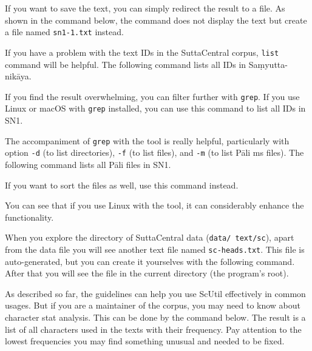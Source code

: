 If you want to save the text, you can simply redirect the result to a file. As shown in the command below, the command does not display the text but create a file named \texttt{sn1-1.txt} instead.


If you have a problem with the text IDs in the SuttaCentral corpus, \texttt{list} command will be helpful. The following command lists all IDs in Saṃyutta-nikāya.


If you find the result overwhelming, you can filter further with \texttt{grep}. If you use Linux or macOS with \texttt{grep} installed, you can use this command to list all IDs in SN1.


The accompaniment of \texttt{grep} with the tool is really helpful, particularly with option \texttt{-d} (to list directories), \texttt{-f} (to list files), and \texttt{-m} (to list Pāli ms files). The following command lists all Pāli files in SN1.


If you want to sort the files as well, use this command instead.


You can see that if you use Linux with the tool, it can considerably enhance the functionality.

When you explore the directory of SuttaCentral data (\texttt{data/ text/sc}), apart from the data file you will see another text file named \texttt{sc-heads.txt}. This file is auto-generated, but you can create it yourselves with the following command. After that you will see the file in the current directory (the program's root).


As described so far, the guidelines can help you use ScUtil effectively in common usages. But if you are a maintainer of the corpus, you may need to know about character stat analysis. This can be done by the command below. The result is a list of all characters used in the texts with their frequency. Pay attention to the lowest frequencies you may find something unusual and needed to be fixed.


